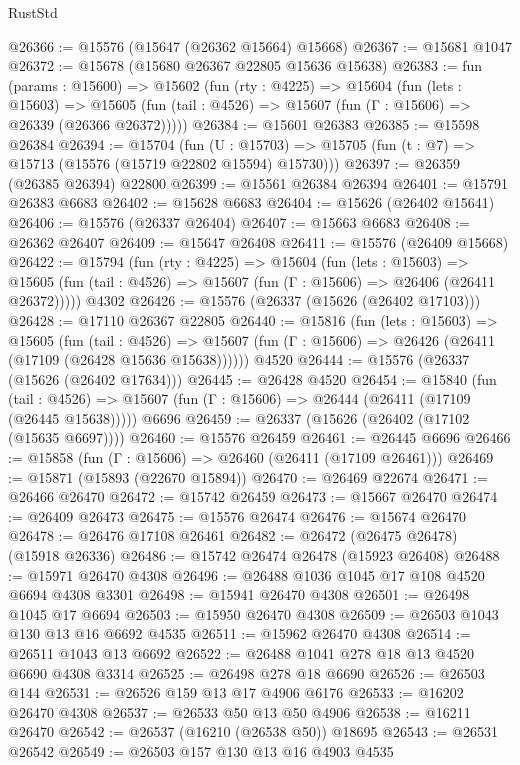 \begin{lexlean}{RustStd}
\begin{coremodule}
@26366 := @15576 (@15647 (@26362 @15664) @15668)
@26367 := @15681 @1047
@26372 := @15678 (@15680 @26367 @22805 @15636 @15638)
@26383 := fun (params : @15600) =>
  @15602
    (fun (rty : @4225) =>
    @15604
      (fun (lets : @15603) =>
      @15605 (fun (tail : @4526) => @15607 (fun (Γ : @15606) => @26339 (@26366 @26372)))))
@26384 := @15601 @26383
@26385 := @15598 @26384
@26394 := @15704
    (fun (U : @15703) => @15705 (fun (t : @7) => @15713 (@15576 (@15719 @22802 @15594) @15730)))
@26397 := @26359 (@26385 @26394) @22800
@26399 := @15561 @26384 @26394
@26401 := @15791 @26383 @6683
@26402 := @15628 @6683
@26404 := @15626 (@26402 @15641)
@26406 := @15576 (@26337 @26404)
@26407 := @15663 @6683
@26408 := @26362 @26407
@26409 := @15647 @26408
@26411 := @15576 (@26409 @15668)
@26422 := @15794
    (fun (rty : @4225) =>
    @15604
      (fun (lets : @15603) =>
      @15605 (fun (tail : @4526) => @15607 (fun (Γ : @15606) => @26406 (@26411 @26372)))))
    @4302
@26426 := @15576 (@26337 (@15626 (@26402 @17103)))
@26428 := @17110 @26367 @22805
@26440 := @15816
    (fun (lets : @15603) =>
    @15605
      (fun (tail : @4526) =>
      @15607 (fun (Γ : @15606) => @26426 (@26411 (@17109 (@26428 @15636 @15638))))))
    @4520
@26444 := @15576 (@26337 (@15626 (@26402 @17634)))
@26445 := @26428 @4520
@26454 := @15840
    (fun (tail : @4526) => @15607 (fun (Γ : @15606) => @26444 (@26411 (@17109 (@26445 @15638)))))
    @6696
@26459 := @26337 (@15626 (@26402 (@17102 (@15635 @6697))))
@26460 := @15576 @26459
@26461 := @26445 @6696
@26466 := @15858 (fun (Γ : @15606) => @26460 (@26411 (@17109 @26461)))
@26469 := @15871 (@15893 (@22670 @15894))
@26470 := @26469 @22674
@26471 := @26466 @26470
@26472 := @15742 @26459
@26473 := @15667 @26470
@26474 := @26409 @26473
@26475 := @15576 @26474
@26476 := @15674 @26470
@26478 := @26476 @17108 @26461
@26482 := @26472 (@26475 @26478) (@15918 @26336)
@26486 := @15742 @26474 @26478 (@15923 @26408)
@26488 := @15971 @26470 @4308
@26496 := @26488 @1036 @1045 @17 @108 @4520 @6694 @4308 @3301
@26498 := @15941 @26470 @4308
@26501 := @26498 @1045 @17 @6694
@26503 := @15950 @26470 @4308
@26509 := @26503 @1043 @130 @13 @16 @6692 @4535
@26511 := @15962 @26470 @4308
@26514 := @26511 @1043 @13 @6692
@26522 := @26488 @1041 @278 @18 @13 @4520 @6690 @4308 @3314
@26525 := @26498 @278 @18 @6690
@26526 := @26503 @144
@26531 := @26526 @159 @13 @17 @4906 @6176
@26533 := @16202 @26470 @4308
@26537 := @26533 @50 @13 @50 @4906
@26538 := @16211 @26470
@26542 := @26537 (@16210 (@26538 @50)) @18695
@26543 := @26531 @26542
@26549 := @26503 @157 @130 @13 @16 @4903 @4535

\end{coremodule}
\end{lexlean}
